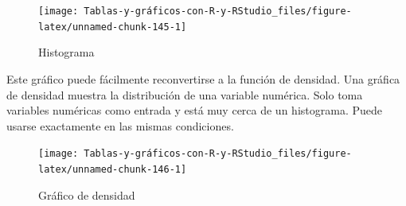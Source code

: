 \documentclass[
]{book}
\newenvironment{Shaded}{\begin{snugshade}}{\end{snugshade}}
\newcommand{\AttributeTok}[1]{\textcolor[rgb]{0.77,0.63,0.00}{#1}}
\newcommand{\ConstantTok}[1]{\textcolor[rgb]{0.00,0.00,0.00}{#1}}
\newcommand{\FunctionTok}[1]{\textcolor[rgb]{0.00,0.00,0.00}{#1}}
\newcommand{\NormalTok}[1]{#1}
\newcommand{\SpecialCharTok}[1]{\textcolor[rgb]{0.00,0.00,0.00}{#1}}
\newcommand{\StringTok}[1]{\textcolor[rgb]{0.31,0.60,0.02}{#1}}
\begin{document}
\begin{Shaded}
\end{Shaded}

\begin{figure}[H]

{\centering \texttt{[image: Tablas-y-gráficos-con-R-y-RStudio\_files/figure-latex/unnamed-chunk-145-1]} 

}

\caption{Histograma}\label{fig:unnamed-chunk-145}
\end{figure}

Este gráfico puede fácilmente reconvertirse a la función de densidad. Una gráfica de densidad muestra la distribución de una variable numérica. Solo toma variables numéricas como entrada y está muy cerca de un histograma. Puede usarse exactamente en las mismas condiciones.

\begin{Shaded}
\end{Shaded}

\begin{figure}[H]

{\centering \texttt{[image: Tablas-y-gráficos-con-R-y-RStudio\_files/figure-latex/unnamed-chunk-146-1]} 

}

\caption{Gráfico de densidad}\label{fig:unnamed-chunk-146}
\end{figure}
\end{document}
